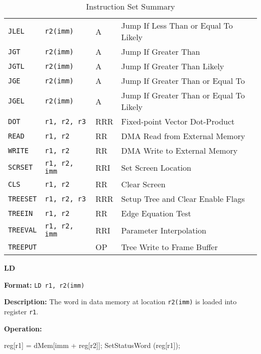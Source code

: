 \begin{table}[ht]
\begin{tabular}{llll}
\tt JLEL&\tt r2(imm)&A&Jump If Less Than or Equal To Likely\\
\tt JGT&\tt r2(imm)&A&Jump If Greater Than\\
\tt JGTL&\tt r2(imm)&A&Jump If Greater Than Likely\\
\tt JGE&\tt r2(imm)&A&Jump If Greater Than or Equal To\\
\tt JGEL&\tt r2(imm)&A&Jump If Greater Than or Equal To Likely\medskip\\
\tt DOT&\tt r1, r2, r3&RRR&Fixed-point Vector Dot-Product\medskip\\
\tt READ&\tt r1, r2&RR&DMA Read from External Memory\\
\tt WRITE&\tt r1, r2&RR&DMA Write to External Memory\medskip\\
\tt SCRSET&\tt r1, r2, imm&RRI&Set Screen Location\\
\tt CLS&\tt r1, r2&RR&Clear Screen\\
\tt TREESET&\tt r1, r2, r3&RRR&Setup Tree and Clear Enable Flags\\
\tt TREEIN&\tt r1, r2&RR&Edge Equation Test\\
\tt TREEVAL&\tt r1, r2, imm&RRI&Parameter Interpolation\\
\tt TREEPUT&\tt &OP&Tree Write to Frame Buffer\\
\end{tabular}
\caption{Instruction Set Summary}
\label{tab:instsummary}
\end{table}

\noindent\textsf{\textbf{\Large LD}}\par
{}\par\begin{indented}{\bf Format:}
{\tt LD r1, r2(imm)}\par\vspace{3ex}
\end{indented}\vspace{4ex}
\begin{indented}{\bf Description:}
The word in data memory at location {\tt r2(imm)} is loaded into
register {\tt r1}.
\end{indented}
\begin{indented}{\bf Operation:}\vspace{.8ex}
\begin{verbatimtab}
reg[r1] = dMem[imm + reg[r2]];
SetStatusWord (reg[r1]);
\end{verbatimtab}
\end{indented}
\vspace{2em}

